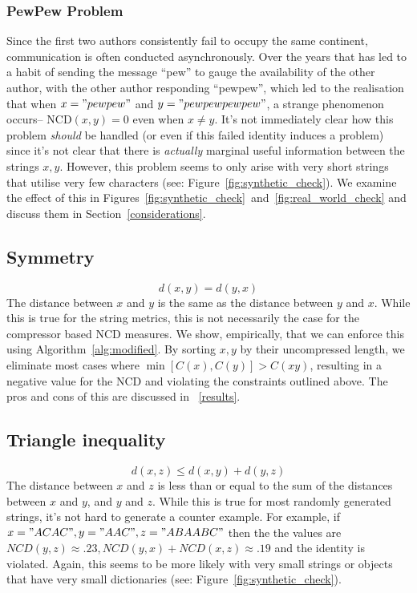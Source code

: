 \documentclass[conference]{IEEEtran}
\begin{document}
\subsubsection{PewPew Problem}
Since the first two authors consistently fail to occupy the same continent, communication is often conducted asynchronously. 
Over the years that has led to a habit of sending the message ``pew'' to gauge the availability of the other author, with the other author responding ``pewpew'', which led to the realisation that when $x = "pewpew"$ and $y="pewpewpewpew"$, a strange phenomenon occurs-- NCD$(x,y) = 0$ even when $x \neq y$. 
It's not immediately clear how this problem \textit{should} be handled (or even if this failed identity induces a problem) since it's not clear that there is \textit{actually} marginal useful information between the strings $x,y$. 
However, this problem seems to only arise with very short strings that utilise very few characters (see: Figure~\ref{fig:synthetic_check}).
We examine the effect of this in Figures~\ref{fig:synthetic_check}~and~\ref{fig:real_world_check} and discuss them in Section~\ref{considerations}.

\subsection{Symmetry} 
$$
d(x, y) = d(y, x)
$$
The distance between $ x $ and $ y $ is the same as the distance between $ y $ and $ x $. While this is true for the string metrics, this is not necessarily the case for the compressor based NCD measures. 
We show, empirically, that we can enforce this using Algorithm~\ref{alg:modified}. 
By sorting $x,y$ by their uncompressed length, we eliminate most cases where $\min[C(x), C(y)] > C(xy)$, resulting in a negative value for the NCD and violating the constraints outlined above.
The pros and cons of this are discussed in ~\ref{results}.

\subsection{Triangle inequality} 
$$
d(x, z) \leq d(x, y) + d(y, z)
$$
The distance between $ x $ and $ z $ is less than or equal to the sum of the distances between $ x $ and $ y $, and $ y $ and $ z $. While this is true for most randomly generated strings, it's not hard to generate a counter example. 
For example, if $ x = "ACAC", y = "AAC", z = "ABAABC" $ then the the values are $ NCD(y,z) \approx .23, NCD(y,x) + NCD(x,z) \approx .19 $ and the identity is violated. 
Again, this seems to be more likely with very small strings or objects that have very small dictionaries (see: Figure~\ref{fig:synthetic_check}).
\end{document}
